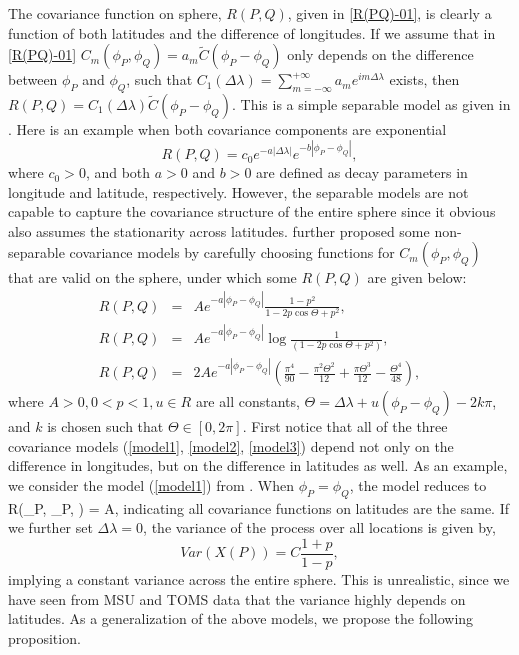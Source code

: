 The covariance function on sphere, $R(P,Q)$,  given in \eqref{R(PQ)-01}, is clearly a function of both latitudes and the difference of longitudes. 
If we assume that in \eqref{R(PQ)-01} $C_m(\phi_P, \phi_Q) = a_m \tilde{C}(\phi_P - \phi_Q)$ only depends on the difference between $\phi_P$ and $\phi_Q$, such that $C_1(\Delta\lambda) = \sum_{m=-\infty}^{+\infty}a_me^{im\Delta\lambda}$ exists, then $R(P, Q) = C_1(\Delta \lambda)\tilde{C}(\phi_P - \phi_Q)$. This is a simple separable model as given in \cite{HuangZhangRobeson2011}. Here is an example when both covariance components are exponential
			\[
				R(P, Q) = c_0e^{-a|\Delta \lambda|}e^{-b|\phi_P - \phi_Q|},
			\]
where $c_0 > 0$, and both $a>0$ and $b>0$ are defined as decay parameters in longitude and latitude, respectively. However, the separable models are not capable to capture the covariance structure of the entire sphere since it obvious also assumes the stationarity across latitudes. \cite{Huang2012} further proposed some non-separable covariance models by carefully choosing functions for $C_m(\phi_P, \phi_Q)$ that are valid on the sphere, under which some $R(P,Q)$ are given below:
			\begin{eqnarray}
				R(P,Q) &=& Ae^{-a|\phi_P-\phi_Q|} \frac{1-p^2}{1-2p \cos\Theta+p^2}, \label{model1}  \\
				R(P,Q) &=& Ae^{-a|\phi_P-\phi_Q|} \log\frac{1}{(1-2p\cos\Theta + p^2)}, \label{model2}  \\
				R(P,Q) &=& 2Ae^{-a|\phi_P-\phi_Q|}\left(\frac{\pi^4}{90}-\frac{\pi^2\Theta^2}{12}+\frac{\pi\Theta^3}{12}-\frac{\Theta^4}{48}\right),\label{model3} 
			\end{eqnarray}
where $A > 0, 0 < p < 1, u \in R$ are all constants, $\Theta = \Delta\lambda + u(\phi_P - \phi_Q) - 2k\pi$, and $k$ is chosen such that $\Theta \in [0,2\pi]$.
First notice that all of the three covariance models (\ref{model1}, \ref{model2}, \ref{model3}) depend not only on the difference in longitudes, but on the difference in latitudes as well. As an example, we consider the model (\ref{model1}) from \cite{Huang2012}. When $\phi_P = \phi_Q$, the model reduces to
			\beq
			\nonumber
			R(\phi_P, \phi_P, \Delta \lambda) = A,
			\eeq
indicating all covariance functions on latitudes are the same. If we further set $\Delta \lambda = 0$, the variance of the process over all locations is given by,
			\[
			Var(X(P)) = C\frac{1+p}{1 - p},
			\]
implying a constant variance across the entire sphere. This is unrealistic, since we have seen from MSU and TOMS data that the variance highly depends on latitudes. As a generalization of the above models, we propose the following proposition.
